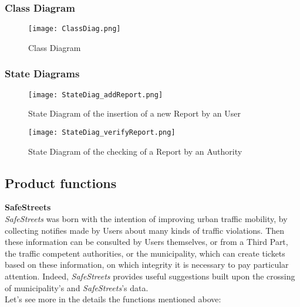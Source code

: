 \vspace{40px}      

\subsubsection{Class Diagram}
    \begin{figure}[h]
        \texttt{[image: ClassDiag.png]}
        \caption{Class Diagram}
        \centering
    \end{figure}

\newpage

\subsubsection{State Diagrams}
    \begin{figure}[h]
        \texttt{[image: StateDiag\_addReport.png]}
        \caption{State Diagram of the insertion of a new Report by an User}
        \centering
    \end{figure}
    
    \vspace{30px}
    
    \begin{figure}[h!]
        \texttt{[image: StateDiag\_verifyReport.png]}
        \caption{State Diagram of the checking of a Report by an Authority}
        \centering
    \end{figure}


\subsection{Product
functions}

\textbf{SafeStreets}\\

\textit{SafeStreets} was born with the intention of improving urban traffic mobility, by collecting notifies made by Users about many kinds of traffic violations. Then these information can be consulted by Users themselves, or from a Third Part, the traffic competent authorities, or the municipality, which can create tickets based on these information, on which integrity it is necessary to pay particular attention. Indeed, \textit{SafeStreets} provides useful suggestions built upon the crossing of municipality's and \textit{SafeStreets}'s data. \\
Let's see more in the details the functions mentioned above:\\\\


